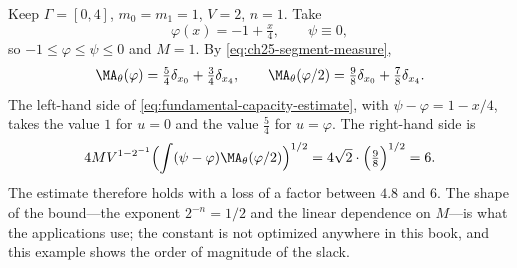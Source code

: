 \begin{example}
\label{ex:ch25-fundamental-numbers}
Keep $\Gamma=[0,4]$, $m_0=m_1=1$, $V=2$, $n=1$.  Take
\[
 \varphi(x)=-1+\tfrac x4,\qquad \psi\equiv0,
\]
so $-1\leq\varphi\leq\psi\leq0$ and $M=1$.  By
\eqref{eq:ch25-segment-measure},
\[
 \MA_\theta(\varphi)=\tfrac54\delta_{x_0}+\tfrac34\delta_{x_4},
 \qquad
 \MA_\theta(\varphi/2)=\tfrac98\delta_{x_0}+\tfrac78\delta_{x_4}.
\]
The left-hand side of \eqref{eq:fundamental-capacity-estimate}, with
$\psi-\varphi=1-x/4$, takes the value $1$ for $u=0$ and the value
$\tfrac54$ for $u=\varphi$.  The right-hand side is
\[
 4MV^{1-2^{-1}}\Bigl(\int(\psi-\varphi)\MA_\theta(\varphi/2)\Bigr)^{1/2}
 =4\sqrt2\cdot\Bigl(\tfrac98\Bigr)^{1/2}=6 .
\]
The estimate therefore holds with a loss of a factor between $4.8$ and
$6$.  The shape of the bound---the exponent $2^{-n}=1/2$ and the linear
dependence on $M$---is what the applications use; the constant is not
optimized anywhere in this book, and this example shows the order of
magnitude of the slack.
\end{example}

